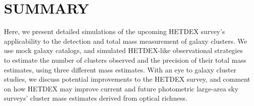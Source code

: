\documentclass[fleqn,usenatbib]{mnras}
\newcommand{\editorial}[1]{\textcolor{red}{#1}}
\begin{document}
	


\section{SUMMARY}\label{sec:summary}
Here, we present detailed simulations of the upcoming HETDEX survey's applicability to the detection and total mass measurement of galaxy clusters. We use mock galaxy catalogs, and simulated HETDEX-like observational strategies to estimate the number of clusters observed and the precision of their total mass estimates, using three different mass estimates. With an eye to galaxy cluster studies, we discuss potential improvements to the HETDEX survey, and comment on how HETDEX may improve current and future photometric large-area sky surveys' cluster mass estimates derived from optical richness.
\end{document}
